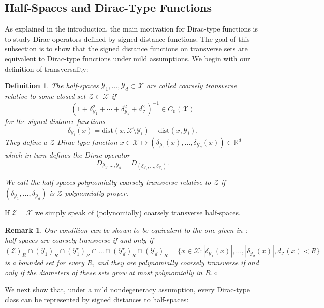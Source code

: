 \documentclass[12pt]{amsart}
\newtheorem{definition}[theorem]{Definition}
\newtheorem{remark}[theorem]{Remark}
\newcommand{\RM}{{\mathbb R}}
\newcommand{\Xx}{{\mathcal X}}
\newcommand{\Yy}{{\mathcal Y}}
\newcommand{\Zz}{{\mathcal Z}}
\begin{document}
\subsection{Half-Spaces and Dirac-Type Functions}
As explained in the introduction, the main motivation for Dirac-type functions is to study Dirac operators defined by signed distance functions. 
The goal of this subsection is to show that the signed distance functions on transverse sets are equivalent to Dirac-type functions under mild assumptions.
We begin with our definition of transversality:
\begin{definition}
\label{def:half-space_dirac}  
The half-spaces $\Yy_1,\dots, \Yy_d\subset \Xx$ are called coarsely transverse relative to some closed set $\Zz\subset \Xx$ if
$$(1+\delta_{\Yy_1}^2+\cdots+\delta_{\Yy_d}^2+d_\Zz^2)^{-1}\in C_0(\Xx)$$
for the signed distance functions
\[\delta_{\Yy_i}(x) =\mathrm{dist}(x, \Xx \setminus \Yy_i)- \mathrm{dist}(x, \Yy_i).\]
They define a  $\Zz$-Dirac-type function $x\in \Xx\mapsto (\delta_{\Yy_1}(x), \dots, \delta_{\Yy_d}(x)) \in \RM^d$ which in turn defines the Dirac operator 
\[D_{\Yy_1,\dots, \Yy_d} = D_{(\delta_{\Yy_1},\ldots,\delta_{\Yy_d})}.\]

We call the half-spaces polynomially coarsely transverse relative to $\Zz$ if $(\delta_{\Yy_1},\ldots,\delta_{\Yy_d})$ is $\Zz$-polynomially proper.
\end{definition}
If $\Zz=\Xx$ we simply speak of (polynomially) coarsely transverse half-spaces.
\begin{remark}
{\rm 
Our condition can be shown to be equivalent to the one given in \cite{LudewigThiang2023}: half-spaces are coarsely transverse if and only if
$$(\Zz)_R\cap (\Yy_1)_R \cap (\Yy^c_1)_R \cap \dots \cap (\Yy_d^c)_R \cap (\Yy_d)_R = \{x\in \Xx:|\delta_{\Yy_1}(x)|,\ldots,|\delta_{\Yy_d}(x)|,d_\Zz(x) < R\}$$
is a bounded set for every $R$, and they are polynomially coarsely transverse if and only if the diameters of these sets grow at most polynomially in $R$.}$\diamond$
\end{remark}

We next show that, under a mild nondegeneracy assumption, every Dirac-type class can be represented by signed distances to half-spaces:
\end{document}
